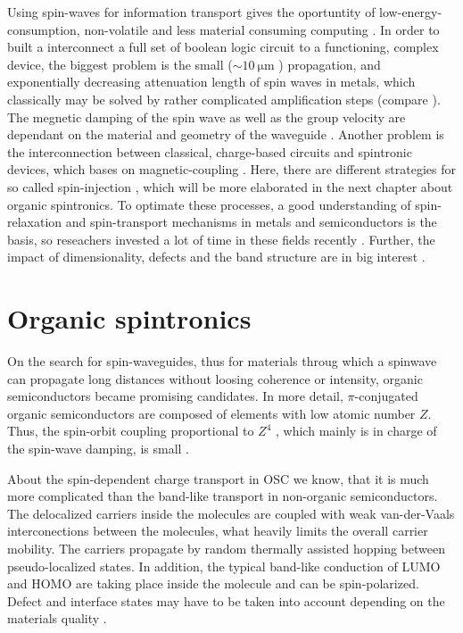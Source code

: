 Using spin-waves for information transport gives the oportuntity of low-energy-consumption, non-volatile and less material consuming computing \cite{clocks}. 
In order to built a interconnect a full set of boolean logic circuit to a functioning, complex device, the biggest problem is the small ($\sim\SI{10}{\micro\meter}$ \cite{computing}) propagation, and exponentially decreasing attenuation length of spin waves in metals, which classically may be solved by rather complicated amplification steps (compare \cite{clocks}).
The megnetic damping of the spin wave as well as the group velocity are dependant on the material and geometry of the waveguide \cite{computing} \cite{SC-spintronics}.
Another problem is the interconnection between classical, charge-based circuits and spintronic devices, which bases on magnetic-coupling \cite{clocks}. 
Here, there are different strategies for so called spin-injection \cite{perovskite}, which will be more elaborated in the next chapter about organic spintronics.
To optimate these processes, a good understanding of spin-relaxation and spin-transport mechanisms in metals and semiconductors is the basis, so reseachers invested a lot of time in these fields recently \cite{perovskite}.
Further, the impact of dimensionality, defects and the band structure are in big interest \cite{perovskite} \cite{SC-spintronics}.



\section{Organic spintronics}
\label{sec:org-spintronics}
On the search for spin-waveguides, thus for materials throug which a spinwave can propagate long distances without loosing coherence or intensity, organic semiconductors became promising candidates.
In more detail, $\pi$-conjugated organic semiconductors are composed of elements with low atomic number $Z$.
Thus, the spin-orbit coupling proportional to $Z^4$ \cite{valve}, which mainly is in charge of the spin-wave damping, is small \cite{appl-organic}.

About the spin-dependent charge transport in OSC we know, that it is much more complicated than the band-like transport in non-organic semiconductors.
The delocalized carriers inside the molecules are coupled with weak van-der-Vaals interconections between the molecules, what heavily limits the overall carrier mobility.
The carriers propagate by random thermally assisted hopping between pseudo-localized states.
In addition, the typical band-like conduction of LUMO and HOMO are taking place inside the molecule and can be spin-polarized.
Defect and interface states may have to be taken into account depending on the materials quality \cite{valve} \cite{perovskite}.

